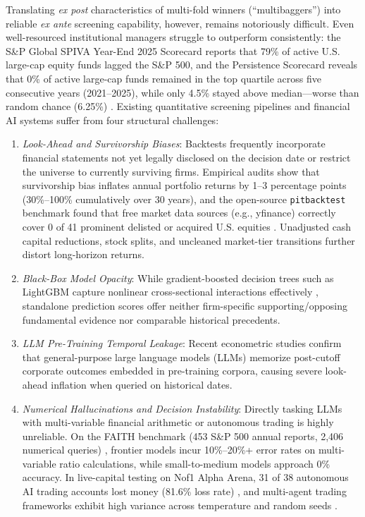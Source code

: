 \documentclass[conference]{IEEEtran}
\begin{document}
Translating \emph{ex post} characteristics of multi-fold winners (``multibaggers'') into reliable \emph{ex ante} screening capability, however, remains notoriously difficult. Even well-resourced institutional managers struggle to outperform consistently: the S\&P Global SPIVA Year-End 2025 Scorecard reports that 79\% of active U.S. large-cap equity funds lagged the S\&P 500, and the Persistence Scorecard reveals that 0\% of active large-cap funds remained in the top quartile across five consecutive years (2021--2025), while only 4.5\% stayed above median---worse than random chance (6.25\%) \cite{spiva2026}. Existing quantitative screening pipelines and financial AI systems suffer from four structural challenges:
\begin{enumerate}
    \item \emph{Look-Ahead and Survivorship Biases}: Backtests frequently incorporate financial statements not yet legally disclosed on the decision date or restrict the universe to currently surviving firms. Empirical audits show that survivorship bias inflates annual portfolio returns by 1--3 percentage points (30\%--100\% cumulatively over 30 years), and the open-source \texttt{pitbacktest} benchmark found that free market data sources (e.g., yfinance) correctly cover 0 of 41 prominent delisted or acquired U.S. equities \cite{gao2026}. Unadjusted cash capital reductions, stock splits, and uncleaned market-tier transitions further distort long-horizon returns.
    \item \emph{Black-Box Model Opacity}: While gradient-boosted decision trees such as LightGBM capture nonlinear cross-sectional interactions effectively \cite{gu2020}, standalone prediction scores offer neither firm-specific supporting/opposing fundamental evidence nor comparable historical precedents.
    \item \emph{LLM Pre-Training Temporal Leakage}: Recent econometric studies \cite{he2025chrono, didisheim2025, gao2026} confirm that general-purpose large language models (LLMs) memorize post-cutoff corporate outcomes embedded in pre-training corpora, causing severe look-ahead inflation when queried on historical dates.
    \item \emph{Numerical Hallucinations and Decision Instability}: Directly tasking LLMs with multi-variable financial arithmetic or autonomous trading is highly unreliable. On the FAITH benchmark (453 S\&P 500 annual reports, 2,406 numerical queries) \cite{faith2025}, frontier models incur 10\%--20\%+ error rates on multi-variable ratio calculations, while small-to-medium models approach 0\% accuracy. In live-capital testing on Nof1 Alpha Arena, 31 of 38 autonomous AI trading accounts lost money (81.6\% loss rate) \cite{alphaarena2026}, and multi-agent trading frameworks exhibit high variance across temperature and random seeds \cite{xiao2025tradingagents}.
\end{enumerate}
\end{document}
